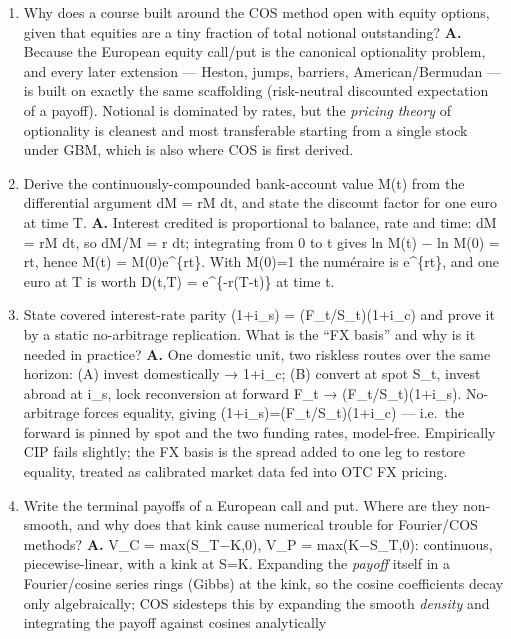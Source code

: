 \documentclass[
  11pt,
]{article}
\providecommand{\tightlist}{%
  \setlength{\itemsep}{0pt}\setlength{\parskip}{0pt}}
\begin{document}
\begin{enumerate}
\def\labelenumi{\arabic{enumi}.}
\tightlist
\item
  Why does a course built around the COS method open with equity
  options, given that equities are a tiny fraction of total notional
  outstanding? \textbf{A.} Because the European equity call/put is the
  canonical optionality problem, and every later extension --- Heston,
  jumps, barriers, American/Bermudan --- is built on exactly the same
  scaffolding (risk-neutral discounted expectation of a payoff).
  Notional is dominated by rates, but the \emph{pricing theory} of
  optionality is cleanest and most transferable starting from a single
  stock under GBM, which is also where COS is first derived.
\item
  Derive the continuously-compounded bank-account value M(t) from the
  differential argument dM = rM dt, and state the discount factor for
  one euro at time T. \textbf{A.} Interest credited is proportional to
  balance, rate and time: dM = rM dt, so dM/M = r dt; integrating from 0
  to t gives ln M(t) − ln M(0) = rt, hence M(t) = M(0)e\^{}\{rt\}. With
  M(0)=1 the numéraire is e\^{}\{rt\}, and one euro at T is worth D(t,T)
  = e\^{}\{-r(T-t)\} at time t.
\item
  State covered interest-rate parity (1+i\_s) = (F\_t/S\_t)(1+i\_c) and
  prove it by a static no-arbitrage replication. What is the ``FX
  basis'' and why is it needed in practice? \textbf{A.} One domestic
  unit, two riskless routes over the same horizon: (A) invest
  domestically → 1+i\_c; (B) convert at spot S\_t, invest abroad at
  i\_s, lock reconversion at forward F\_t → (F\_t/S\_t)(1+i\_s).
  No-arbitrage forces equality, giving (1+i\_s)=(F\_t/S\_t)(1+i\_c) ---
  i.e.~the forward is pinned by spot and the two funding rates,
  model-free. Empirically CIP fails slightly; the FX basis is the spread
  added to one leg to restore equality, treated as calibrated market
  data fed into OTC FX pricing.
\item
  Write the terminal payoffs of a European call and put. Where are they
  non-smooth, and why does that kink cause numerical trouble for
  Fourier/COS methods? \textbf{A.} V\_C = max(S\_T−K,0), V\_P =
  max(K−S\_T,0): continuous, piecewise-linear, with a kink at S=K.
  Expanding the \emph{payoff} itself in a Fourier/cosine series rings
  (Gibbs) at the kink, so the cosine coefficients decay only
  algebraically; COS sidesteps this by expanding the smooth
  \emph{density} and integrating the payoff against cosines analytically

\end{enumerate}
\end{document}
